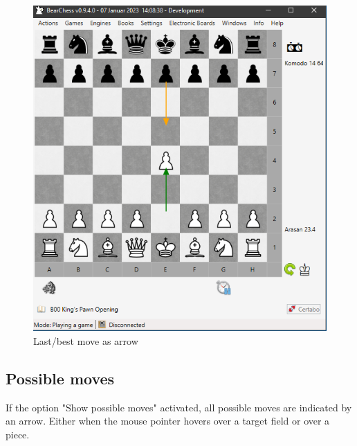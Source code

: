 \documentclass[11pt,a4paper]{article}
\begin{document}
\begin{figure}[H]
	\centering
	\includegraphics[scale=0.8]{LastMoveArrow.png}
	\caption{Last/best move as arrow}
	\label{fig:LastMove2}
\end{figure}

\subsection{Possible moves}
If the option "Show possible moves" activated, all possible moves are indicated by an arrow.
Either when the mouse pointer hovers over a target field or over a piece.
\end{document}
